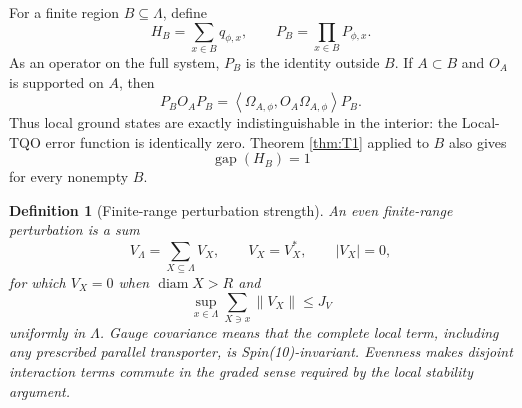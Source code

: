 \documentclass[11pt]{article}
\newtheorem{definition}[theorem]{Definition}
\theoremstyle{remark}
\newcommand{\gap}{\operatorname{gap}}
\newcommand{\norm}[1]{\left\lVert #1\right\rVert}
\newcommand{\ip}[2]{\left\langle #1,#2\right\rangle}
\begin{document}
For a finite region $B\subseteq\Lambda$, define
\[
 H_B=\sum_{x\in B}q_{\phi,x},\qquad
 P_B=\prod_{x\in B}P_{\phi,x}.
\tag{4.1}\label{eq:localHB}
\]
As an operator on the full system, $P_B$ is the identity outside
$B$.  If $A\subset B$ and $O_A$ is supported on $A$, then
\[
 P_BO_AP_B
 =\ip{\Omega_{A,\phi}}{O_A\Omega_{A,\phi}}P_B.
\tag{4.2}\label{eq:exactLTQO}
\]
Thus local ground states are exactly indistinguishable in the
interior: the Local-TQO error function is identically zero.  Theorem
\ref{thm:T1} applied to $B$ also gives
\[
 \gap(H_B)=1
\tag{4.3}\label{eq:localgap}
\]
for every nonempty $B$.

\begin{definition}[Finite-range perturbation strength]
\label{def:pert}
An even finite-range perturbation is a sum
\[
 V_\Lambda=\sum_{X\subseteq\Lambda}V_X,\qquad
 V_X=V_X^*,\qquad |V_X|=0,
\tag{4.4}\label{eq:pert}
\]
for which $V_X=0$ when $\operatorname{diam}X>R$ and
\[
 \sup_{x\in\Lambda}\sum_{X\ni x}\norm{V_X}\leq J_V
\tag{4.5}\label{eq:interactionnorm}
\]
uniformly in $\Lambda$.  Gauge covariance means that the complete
local term, including any prescribed parallel transporter, is
Spin(10)-invariant.  Evenness makes disjoint interaction terms commute
in the graded sense required by the local stability argument.
\end{definition}
\end{document}
